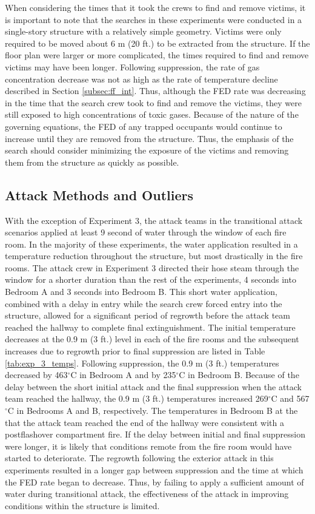 \documentclass[12pt,oneside]{article}
\begin{document}
When considering the times that it took the crews to find and remove victims, it is important to note that the searches in these experiments were conducted in a single-story structure with a relatively simple geometry. Victims were only required to be moved about 6 m (20 ft.) to be extracted from the structure. If the floor plan were larger or more complicated, the times required to find and remove victims may have been longer. Following suppression, the rate of gas concentration decrease was not as high as the rate of temperature decline described in Section \ref{subsec:ff_int}. Thus, although the FED rate was decreasing in the time that the search crew took to find and remove the victims, they were still exposed to high concentrations of toxic gases. Because of the nature of the governing equations, the FED of any trapped occupants would continue to increase until they are removed from the structure. Thus, the emphasis of the search should consider minimizing the exposure of the victims and removing them from the structure as quickly as possible.

\subsection{Attack Methods and Outliers}

With the exception of Experiment 3, the attack teams in the transitional attack scenarios applied at least 9 second of water through the window of each fire room. In the majority of these experiments, the water application resulted in a temperature reduction throughout the structure, but most drastically in the fire rooms. The attack crew in Experiment 3 directed their hose steam through the window for a shorter duration than the rest of the experiments, 4 seconds into Bedroom A and 3 seconds into Bedroom B. This short water application, combined with a delay in entry while the search crew forced entry into the structure, allowed for a significant period of regrowth before the attack team reached the hallway to complete final extinguishment. The initial temperature decreases at the 0.9 m (3 ft.) level in each of the fire rooms and the subsequent increases due to regrowth prior to final suppression are listed in Table \ref{tab:exp_3_temps}. Following suppression, the 0.9 m (3 ft.) temperatures decreased by 463$^{\circ}$C in Bedroom A and by 235$^{\circ}$C in Bedroom B. Because of the delay between the short initial attack and the final suppression when the attack team reached the hallway, the 0.9 m (3 ft.) temperatures increased 269$^{\circ}$C and 567$^{\circ}$C in Bedrooms A and B, respectively. The temperatures in Bedroom B at the that the attack team reached the end of the hallway were consistent with a postflashover compartment fire. If the delay between initial and final suppression were longer, it is likely that conditions remote from the fire room would have started to deteriorate. The regrowth following the exterior attack in this experiments resulted in a longer gap between suppression and the time at which the FED rate began to decrease. Thus, by failing to apply a sufficient amount of water  during transitional attack, the effectiveness of the attack in improving conditions within the structure is limited. 
\end{document}
